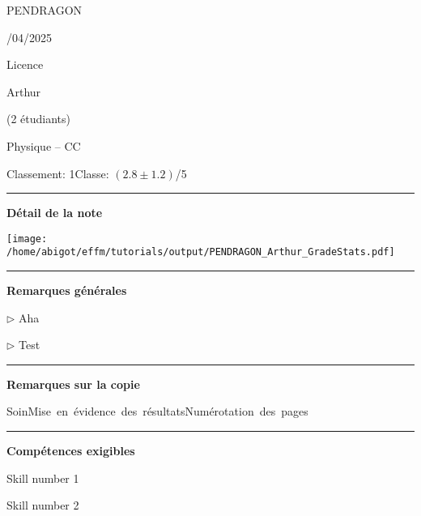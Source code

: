 \documentclass[12pt, a4paper]{article}
\begin{document}
\pagestyle{empty}
\noindent\begin{minipage}[c]{0.31\linewidth}\noindent PENDRAGON\end{minipage}\hfill
\begin{minipage}[c]{0.31\linewidth}/04/2025 \end{minipage}\hfill
\begin{minipage}[c]{0.31\linewidth}\hfill Licence \end{minipage}\hfill

\noindent\begin{minipage}[c]{0.31\linewidth}\noindent Arthur\end{minipage}\hfill
\begin{minipage}[c]{0.31\linewidth}\hfill(2 étudiants)\end{minipage}
\begin{center} Physique -- CC\bigskip

{\Large\bf {}}\end{center}

\vspace*{-0.7cm}\noindent Classement: 1\hfill Classe:  $\left(2.8 \pm 1.2\right)$/5
\noindent\rule{\linewidth}{.7pt}\begin{center}{\large\bf Détail de la note}\end{center}

\begin{center}
\texttt{[image: /home/abigot/effm/tutorials/output/PENDRAGON\_Arthur\_GradeStats.pdf]}\end{center}


\noindent\rule{\linewidth}{.7pt}\begin{center}{\large\bf Remarques générales}\end{center}

$\triangleright$\xspace Aha

$\triangleright$\xspace Test


\noindent\rule{\linewidth}{.7pt}\begin{center}{\large\bf Remarques sur la copie}\end{center}

\begin{center}
\noindent \mbox{Soin\xspace\xspace\color{DarkRed}\faFrownO\color{black}}\hfill \mbox{Mise en évidence des résultats\xspace\xspace\color{DarkOrange}\faMehO\color{black}}\hfill \mbox{Numérotation des pages\xspace\xspace\color{DarkGreen}\faSmileO\color{black}}\hfill 
\end{center}


\noindent\rule{\linewidth}{.7pt}\begin{center}{\large\bf Compétences exigibles}\end{center}

\begin{minipage}[c]{0.4\linewidth}\centering
Skill number 1\xspace\xspace\color{DarkOrange}\faMehO\color{black}
\end{minipage}\hfill
\begin{minipage}[c]{0.4\linewidth}\centering
Skill number 2\xspace\xspace\color{DarkRed}\faFrownO\color{black}
\end{minipage}
\end{document}
